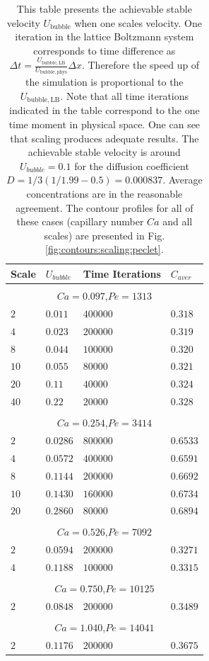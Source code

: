 \documentclass{article}
\newcommand{\ububble}{U_{\mathrm{bubble}}}
\begin{document}
\begin{table}[htb!]
\begin{tabularx}{\textwidth}{|X|X|X|X|}
\hline
Scale&$U_{bubble}$&Time Iterations&$C_{aver}$\\
\hline
\multicolumn{4}{c}{}\\
\multicolumn{4}{c}{$Ca=0.097$,$Pe=1313$}\\
\hline
$2$ &$0.011$&$400000$&$0.318$\\
$4$ &$0.023$&$200000$&$0.319$\\
$8$ &$0.044$&$100000$&$0.320$\\
$10$&$0.055$&$80000$ &$0.321$\\
$20$&$0.11 $&$40000$ &$0.324$\\
$40$&$0.22 $&$20000$ &$0.328$\\
\hline
\multicolumn{4}{c}{}\\
\multicolumn{4}{c}{$Ca=0.254$,$Pe=3414$}\\
\hline
$2$& $0.0286$&$800000$&$0.6533$\\
$4$& $0.0572$&$400000$&$0.6591$\\
$8$& $0.1144$&$200000$&$0.6692$\\
$10$&$0.1430$&$160000$&$0.6734$\\
$20$&$0.2860$&$80000$ &$0.6894$\\
\hline
\multicolumn{4}{c}{}\\
\multicolumn{4}{c}{$Ca=0.526$,$Pe=7092$}\\
\hline
$2$&$0.0594$&$200000$&$0.3271$\\
$4$&$0.1188$&$100000$&$0.3315$\\
\hline
\multicolumn{4}{c}{}\\
\multicolumn{4}{c}{$Ca=0.750$,$Pe=10125$}\\
\hline
$2$&$0.0848$&$200000$&$0.3489$\\
\hline
\multicolumn{4}{c}{}\\
\multicolumn{4}{c}{$Ca=1.040$,$Pe=14041$}\\
\hline
$2$&$0.1176$&$200000$&$0.3675$\\
\hline
\end{tabularx}
\caption{This table presents the achievable stable velocity $\ububble$ when one scales velocity. One
iteration in the lattice
Boltzmann system corresponds to time difference as
$\Delta t=\frac{U_{\mathrm{bubble,LB}}}{U_{\mathrm{bubble,phys}}} \Delta x$. Therefore the speed up
of the simulation is proportional to the  $U_{\mathrm{bubble,LB}}$. Note that all time
iterations
indicated in the table correspond to the one time moment in physical space. One can see that
scaling produces adequate results.  The achievable stable velocity is around $U_{bubble}=0.1$ for
the diffusion coefficient
$D=1/3(1/1.99-0.5)=0.000837$. Average concentrations are in the reasonable agreement. The contour
profiles for all of these cases (capillary number $Ca$ and all scales) are presented in Fig.
\ref{fig:contours:scaling:peclet}.
\label{table:scaling:peclet}}
\end{table}
\end{document}
